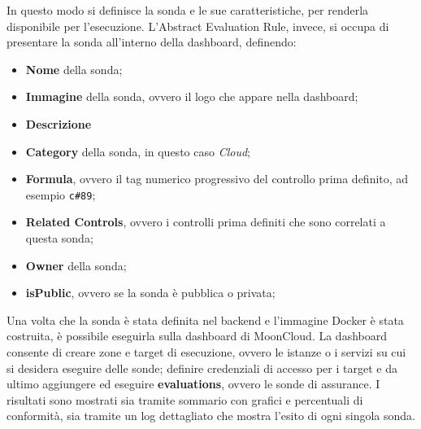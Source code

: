 In questo modo si definisce la sonda e le sue caratteristiche, per renderla disponibile per l'esecuzione. L'Abstract Evaluation Rule, invece, si occupa di presentare la sonda all'interno della dashboard, definendo:

\begin{itemize}
    \item \textbf{Nome} della sonda;
    \item \textbf{Immagine} della sonda, ovvero il logo che appare nella dashboard;
    \item \textbf{Descrizione}
    \item \textbf{Category} della sonda, in questo caso \textit{Cloud};
    \item \textbf{Formula}, ovvero il tag numerico progressivo del controllo prima definito, ad esempio \texttt{c\#89};
    \item \textbf{Related Controls}, ovvero i controlli prima definiti che sono correlati a questa sonda;
    \item \textbf{Owner} della sonda;
    \item \textbf{isPublic}, ovvero se la sonda è pubblica o privata;
\end{itemize}

Una volta che la sonda è stata definita nel backend e l'immagine Docker è stata costruita, è possibile eseguirla sulla dashboard di MoonCloud. La dashboard consente di creare zone e target di esecuzione, ovvero le istanze o i servizi su cui si desidera eseguire delle sonde; definire credenziali di accesso per i target e da ultimo aggiungere ed eseguire \textbf{evaluations}, ovvero le sonde di assurance. I risultati sono mostrati sia tramite sommario con grafici e percentuali di conformità, sia tramite un log dettagliato che mostra l'esito di ogni singola sonda. 